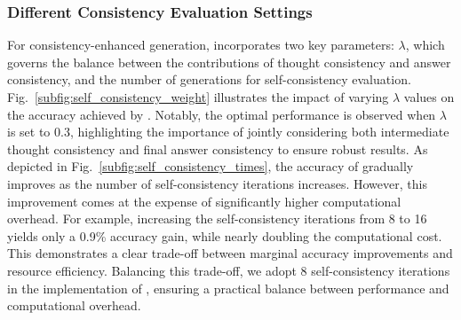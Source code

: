 \subsubsection{Different Consistency Evaluation Settings}
For consistency-enhanced generation, \sysname{} incorporates two key parameters: $\lambda$, which governs the balance between the contributions of thought consistency and answer consistency, and the number of generations for self-consistency evaluation. Fig.~\ref{subfig:self_consistency_weight} illustrates the impact of varying $\lambda$ values on the accuracy achieved by \sysname{}. Notably, the optimal performance is observed when $\lambda$ is set to $0.3$, highlighting the importance of jointly considering both intermediate thought consistency and final answer consistency to ensure robust results. As depicted in Fig.~\ref{subfig:self_consistency_times}, the accuracy of \sysname{} gradually improves as the number of self-consistency iterations increases. However, this improvement comes at the expense of significantly higher computational overhead. For example, increasing the self-consistency iterations from 8 to 16 yields only a 0.9\% accuracy gain, while nearly doubling the computational cost. This demonstrates a clear trade-off between marginal accuracy improvements and resource efficiency. Balancing this trade-off, we adopt 8 self-consistency iterations in the implementation of \sysname{}, ensuring a practical balance between performance and computational overhead.

